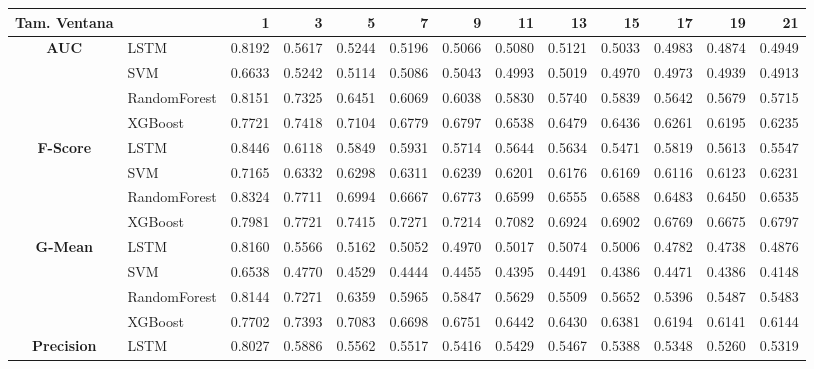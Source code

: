 \begin{table}[h]
	\centering
	\begin{adjustbox}{max width=15cm}
		\begin{tabular}{|c|l|r|r|r|r|r|r|r|r|r|r|r|}
			\hline
			\textbf{Tam. Ventana}&         &      1  &      3  &      5  &      7  &      9  &      11 &      13 &      15 &      17 &      19 &      21 \\
			\hline
			\textbf{AUC} & LSTM &  0.8192 &  0.5617 &  0.5244 &  0.5196 &  0.5066 &  0.5080 &  0.5121 &  0.5033 &  0.4983 &  0.4874 &  0.4949 \\
			& SVM &  0.6633 &  0.5242 &  0.5114 &  0.5086 &  0.5043 &  0.4993 &  0.5019 &  0.4970 &  0.4973 &  0.4939 &  0.4913 \\
			& RandomForest &  0.8151 &  0.7325 &  0.6451 &  0.6069 &  0.6038 &  0.5830 &  0.5740 &  0.5839 &  0.5642 &  0.5679 &  0.5715 \\
			& XGBoost &  0.7721 &  0.7418 &  0.7104 &  0.6779 &  0.6797 &  0.6538 &  0.6479 &  0.6436 &  0.6261 &  0.6195 &  0.6235 \\
			\hline
			\textbf{F-Score} & LSTM &  0.8446 &  0.6118 &  0.5849 &  0.5931 &  0.5714 &  0.5644 &  0.5634 &  0.5471 &  0.5819 &  0.5613 &  0.5547 \\
			& SVM &  0.7165 &  0.6332 &  0.6298 &  0.6311 &  0.6239 &  0.6201 &  0.6176 &  0.6169 &  0.6116 &  0.6123 &  0.6231 \\
			& RandomForest &  0.8324 &  0.7711 &  0.6994 &  0.6667 &  0.6773 &  0.6599 &  0.6555 &  0.6588 &  0.6483 &  0.6450 &  0.6535 \\
			& XGBoost &  0.7981 &  0.7721 &  0.7415 &  0.7271 &  0.7214 &  0.7082 &  0.6924 &  0.6902 &  0.6769 &  0.6675 &  0.6797 \\
			\hline
			\textbf{G-Mean} & LSTM &  0.8160 &  0.5566 &  0.5162 &  0.5052 &  0.4970 &  0.5017 &  0.5074 &  0.5006 &  0.4782 &  0.4738 &  0.4876 \\
			& SVM &  0.6538 &  0.4770 &  0.4529 &  0.4444 &  0.4455 &  0.4395 &  0.4491 &  0.4386 &  0.4471 &  0.4386 &  0.4148 \\
			& RandomForest &  0.8144 &  0.7271 &  0.6359 &  0.5965 &  0.5847 &  0.5629 &  0.5509 &  0.5652 &  0.5396 &  0.5487 &  0.5483 \\
			& XGBoost &  0.7702 &  0.7393 &  0.7083 &  0.6698 &  0.6751 &  0.6442 &  0.6430 &  0.6381 &  0.6194 &  0.6141 &  0.6144 \\
			\hline
			\textbf{Precision} & LSTM &  0.8027 &  0.5886 &  0.5562 &  0.5517 &  0.5416 &  0.5429 &  0.5467 &  0.5388 &  0.5348 &  0.5260 &  0.5319 \\

\end{tabular}
\end{adjustbox}
\end{table}
